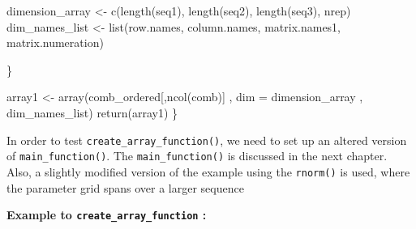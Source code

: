 \documentclass[11pt,a4paper]{article}
\newenvironment{Shaded}{\begin{snugshade}}{\end{snugshade}}
\newcommand{\AttributeTok}[1]{\textcolor[rgb]{0.77,0.63,0.00}{#1}}
\newcommand{\FunctionTok}[1]{\textcolor[rgb]{0.00,0.00,0.00}{#1}}
\newcommand{\NormalTok}[1]{#1}
\newcommand{\OtherTok}[1]{\textcolor[rgb]{0.56,0.35,0.01}{#1}}
\begin{document}
\begin{Shaded}
\begin{Highlighting}[]
\NormalTok{    dimension\_array }\OtherTok{\textless{}{-}} \FunctionTok{c}\NormalTok{(}\FunctionTok{length}\NormalTok{(seq1), }\FunctionTok{length}\NormalTok{(seq2), }\FunctionTok{length}\NormalTok{(seq3), nrep)}
\NormalTok{    dim\_names\_list }\OtherTok{\textless{}{-}} \FunctionTok{list}\NormalTok{(row.names, column.names, }
\NormalTok{                           matrix.names1, matrix.numeration)}
    
\NormalTok{  \}}
  
  
\NormalTok{  array1 }\OtherTok{\textless{}{-}} \FunctionTok{array}\NormalTok{(comb\_ordered[,}\FunctionTok{ncol}\NormalTok{(comb)] }
\NormalTok{                  , }\AttributeTok{dim =}\NormalTok{ dimension\_array}
\NormalTok{                  , dim\_names\_list)}
  \FunctionTok{return}\NormalTok{(array1)}
\NormalTok{\}}
\end{Highlighting}
\end{Shaded}

In order to test \texttt{create\_array\_function()}, we need to set up
an altered version of \texttt{main\_function()}. The
\texttt{main\_function()} is discussed in the next chapter. Also, a
slightly modified version of the example using the \texttt{rnorm()} is
used, where the parameter grid spans over a larger sequence

\textbf{Example to \texttt{create\_array\_function} :}
\end{document}
